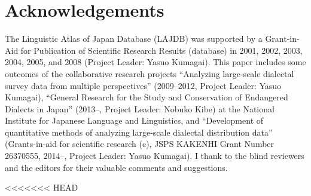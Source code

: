 \documentclass[output=paper]{LSP/langsci}
\begin{document}
\section*{Acknowledgements}
The Linguistic Atlas of Japan Database (LAJDB) was supported by a Grant-in-Aid for Publication of Scientific Research Results (database) in 2001, 2002, 2003, 2004, 2005, and 2008 (Project Leader: Yasuo Kumagai). This paper includes some outcomes of the collaborative research projects “Analyzing large-scale dialectal survey data from multiple perspectives” (2009–2012, Project Leader: Yasuo Kumagai), “General Research for the Study and Conservation of Endangered Dialects in Japan” (2013–, Project Leader: Nobuko Kibe) at the National Institute for Japanese Language and Linguistics, and “Development of quantitative methods of analyzing large-scale dialectal distribution data” (Grants-in-aid for scientific research (c), JSPS KAKENHI Grant Number 26370555, 2014–, Project Leader: Yasuo Kumagai). I thank to the blind reviewers and the editors for their valuable comments and suggestions.

\printbibliography[heading=subbibliography,notkeyword=this]
<<<<<<< HEAD
\end{document}
